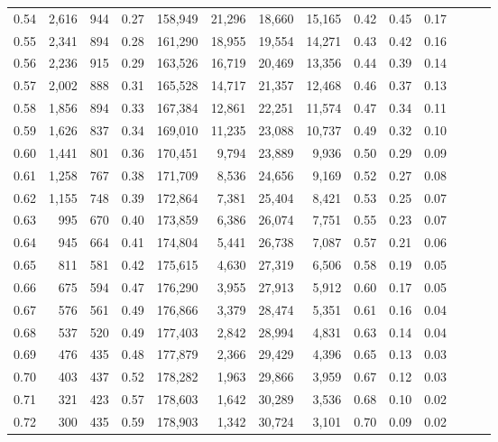 \begin{tabular}{rrrrrrrrrrrrrr}
0.54 &  2,616 &    944 &  0.27 &  158,949 &   21,296 &  18,660 &  15,165 &  0.42 &  0.45 &      0.17 \\
0.55 &  2,341 &    894 &  0.28 &  161,290 &   18,955 &  19,554 &  14,271 &  0.43 &  0.42 &      0.16 \\
0.56 &  2,236 &    915 &  0.29 &  163,526 &   16,719 &  20,469 &  13,356 &  0.44 &  0.39 &      0.14 \\
0.57 &  2,002 &    888 &  0.31 &  165,528 &   14,717 &  21,357 &  12,468 &  0.46 &  0.37 &      0.13 \\
0.58 &  1,856 &    894 &  0.33 &  167,384 &   12,861 &  22,251 &  11,574 &  0.47 &  0.34 &      0.11 \\
0.59 &  1,626 &    837 &  0.34 &  169,010 &   11,235 &  23,088 &  10,737 &  0.49 &  0.32 &      0.10 \\
0.60 &  1,441 &    801 &  0.36 &  170,451 &    9,794 &  23,889 &   9,936 &  0.50 &  0.29 &      0.09 \\
0.61 &  1,258 &    767 &  0.38 &  171,709 &    8,536 &  24,656 &   9,169 &  0.52 &  0.27 &      0.08 \\
0.62 &  1,155 &    748 &  0.39 &  172,864 &    7,381 &  25,404 &   8,421 &  0.53 &  0.25 &      0.07 \\
0.63 &    995 &    670 &  0.40 &  173,859 &    6,386 &  26,074 &   7,751 &  0.55 &  0.23 &      0.07 \\
0.64 &    945 &    664 &  0.41 &  174,804 &    5,441 &  26,738 &   7,087 &  0.57 &  0.21 &      0.06 \\
0.65 &    811 &    581 &  0.42 &  175,615 &    4,630 &  27,319 &   6,506 &  0.58 &  0.19 &      0.05 \\
0.66 &    675 &    594 &  0.47 &  176,290 &    3,955 &  27,913 &   5,912 &  0.60 &  0.17 &      0.05 \\
0.67 &    576 &    561 &  0.49 &  176,866 &    3,379 &  28,474 &   5,351 &  0.61 &  0.16 &      0.04 \\
0.68 &    537 &    520 &  0.49 &  177,403 &    2,842 &  28,994 &   4,831 &  0.63 &  0.14 &      0.04 \\
0.69 &    476 &    435 &  0.48 &  177,879 &    2,366 &  29,429 &   4,396 &  0.65 &  0.13 &      0.03 \\
0.70 &    403 &    437 &  0.52 &  178,282 &    1,963 &  29,866 &   3,959 &  0.67 &  0.12 &      0.03 \\
0.71 &    321 &    423 &  0.57 &  178,603 &    1,642 &  30,289 &   3,536 &  0.68 &  0.10 &      0.02 \\
0.72 &    300 &    435 &  0.59 &  178,903 &    1,342 &  30,724 &   3,101 &  0.70 &  0.09 &      0.02 \\

\end{tabular}

